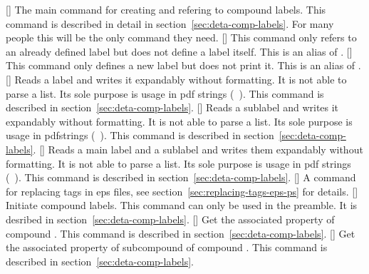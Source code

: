 \documentclass[load-preamble+,ngerman,british,american]{cnltx-doc}
\begin{document}
\begin{commands}
  [\sarg\code{+}]
    The main command for creating and refering to compound labels.  This
    command is described in detail in section~\ref{sec:deta-comp-labels}.  For
    many people this will be the only command they need.
  []
    This command only refers to an already defined label but does not define a
    label itself.  This is an alias of \code{+}.
  []
    This command only defines a new label but does not print it.  This is an
    alias of \sarg.
  \expandable{}[]
    Reads a label and writes it expandably without formatting.  It is not able
    to parse a list.  Its sole purpose is usage in \ac{pdf} strings
    (\cf\ \marg{\TeX}).  This
    command is described in section~\ref{sec:deta-comp-labels}.
  \expandable{}[]
    Reads a sublabel and writes it expandably without formatting.  It is not
    able to parse a list.  Its sole purpose is usage in pdfstrings
    (\cf\ \marg{\TeX}).  This
    command is described in section~\ref{sec:deta-comp-labels}.
  \expandable{}[]
    Reads a main label and a sublabel and writes them expandably without
    formatting.  It is not able to parse a list.  Its sole purpose is usage in
    \ac{pdf} strings (\cf\ \marg{\TeX}). This command is described in
    section~\ref{sec:deta-comp-labels}.
  [\code{+}]
    A command for replacing tags in \ac{eps} files, see
    section~\ref{sec:replacing-tags-eps-ps} for details.
  []
    Initiate compound labels.  This command can only be used in the preamble.
    It is desribed in section~\ref{sec:deta-comp-labels}.
  \expandable{}[]
    Get the associated property  of compound
    . This command is described in
    section~\ref{sec:deta-comp-labels}.
  \expandable{}[]
    Get the associated property  of subcompound  of compound .  This command is described
    in section~\ref{sec:deta-comp-labels}.

\end{commands}
\end{document}
